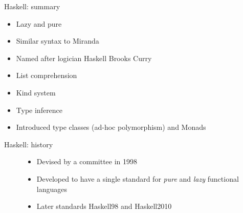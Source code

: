 \documentclass[pdf]{beamer}
\begin{document}
\begin{frame}{Haskell: summary}
  \begin{figure}[H]
    \centering
    \hspace{0.3cm}
  \end{figure}
      \begin{itemize}
      \item Lazy and pure
      \item Similar syntax to Miranda
      \item Named after logician Haskell Brooks Curry
      \item List comprehension
      \item Kind system
      \item Type inference
      \item Introduced type classes (ad-hoc polymorphism) and Monads
      \end{itemize}
\end{frame}

\begin{frame}{Haskell: history}
  \begin{figure}[H]
    \centering
    \begin{itemize}
    \item Devised by a committee in 1998
    \item Developed to have a single standard for \textit{pure} and \textit{lazy} functional languages
    \item Later standards Haskell98 and Haskell2010
    \end{itemize}
  \end{figure}
\end{frame}
\end{document}
